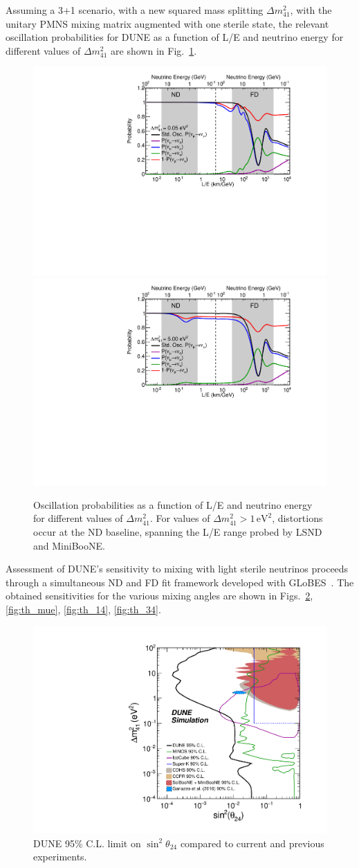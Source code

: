 Assuming a 3+1 scenario, with a new squared mass splitting $\Delta m^2_{41}$, with the unitary PMNS mixing matrix augmented with one sterile state, the relevant oscillation probabilities for DUNE as a function of L/E and neutrino energy for different values of $\Delta m^2_{41}$ are shown in Fig.~\ref{fig:LoverE}. 
\begin{figure}[!htbp]
\includegraphics[width=0.49\columnwidth]{./figures/DUNE_SterileSensi_dm0_05}
\includegraphics[width=0.49\columnwidth]{./figures/DUNE_SterileSensi_dm5}
\caption{\label{fig:LoverE} Oscillation probabilities as a function of L/E and neutrino energy for different values of $\Delta m^2_{41}$. For values of $\Delta m^2_{41} > 1\,\mathrm{eV}^2$, distortions occur at the ND baseline, spanning the L/E range probed by LSND and MiniBooNE.}
\end{figure}

Assessment of DUNE's sensitivity to mixing with light sterile neutrinos proceeds through a simultaneous ND and FD fit framework developed with GLoBES~\cite{ref:globes}.
The obtained sensitivities for the various mixing angles are shown in Figs.~\ref{fig:th_24}, \ref{fig:th_mue}, \ref{fig:th_14}, \ref{fig:th_34}. 

\begin{figure}[!htbp]
\centering
\includegraphics[width=0.5\columnwidth]{./figures/MultiPlots_DUNE_MINOS_IceCube_globAppF_th_24}
\caption{\label{fig:th_24} DUNE 95\% C.L. limit on $\sin^2 \theta_{24}$ compared to current and previous experiments.}
\end{figure}

